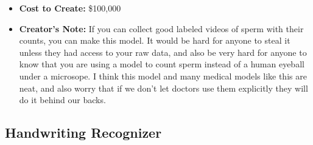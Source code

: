 \begin{itemize}
    \item \textbf{Cost to Create:} \$100,000
    \item \textbf{Creator's Note:} If you can collect good labeled videos of sperm with their counts, you can make this model. It would be hard for anyone to steal it unless they had access to your raw data, and also be very hard for anyone to know that you are using a model to count sperm instead of a human eyeball under a microsope. I think this model and many medical models like this are neat, and also worry that if we don't let doctors use them explicitly they will do it behind our backs. 
\end{itemize}

\subsection{Handwriting Recognizer}

